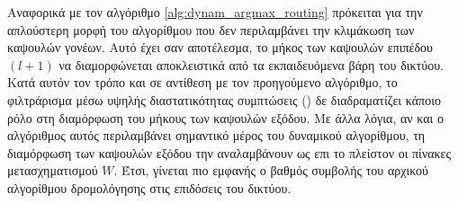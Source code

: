 
Αναφορικά με τον αλγόριθμο \ref{alg:dynam_argmax_routing} πρόκειται για την απλούστερη μορφή του αλγορίθμου  που δεν περιλαμβάνει την κλιμάκωση των καψουλών γονέων. Αυτό έχει σαν αποτέλεσμα, το μήκος των καψουλών επιπέδου $(l+1)$ να διαμορφώνεται αποκλειστικά από τα εκπαιδευόμενα βάρη του δικτύου. Κατά αυτόν τον τρόπο και σε αντίθεση με τον προηγούμενο αλγόριθμο, το φιλτράρισμα μέσω υψηλής διαστατικότητας συμπτώσεις () δε διαδραματίζει κάποιο ρόλο στη διαμόρφωση του μήκους των καψουλών εξόδου. Με άλλα λόγια, αν και ο αλγόριθμος αυτός περιλαμβάνει σημαντικό μέρος του δυναμικού αλγορίθμου, τη διαμόρφωση των καψουλών εξόδου την αναλαμβάνουν ως επι το πλείστον οι πίνακες μετασχηματισμού $W$. Έτσι, γίνεται πιο εμφανής ο βαθμός συμβολής του αρχικού αλγορίθμου δρομολόγησης στις επιδόσεις του δικτύου.


